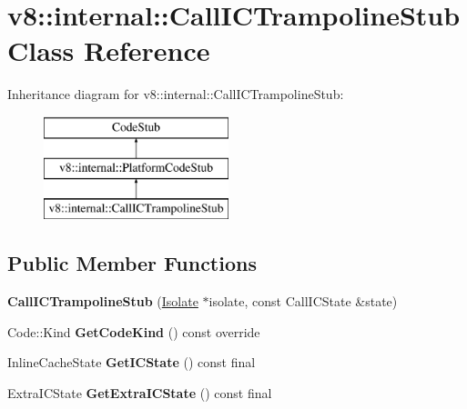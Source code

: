 \hypertarget{classv8_1_1internal_1_1_call_i_c_trampoline_stub}{}\section{v8\+:\+:internal\+:\+:Call\+I\+C\+Trampoline\+Stub Class Reference}
\label{classv8_1_1internal_1_1_call_i_c_trampoline_stub}
Inheritance diagram for v8\+:\+:internal\+:\+:Call\+I\+C\+Trampoline\+Stub\+:\begin{figure}[H]
\begin{center}
\leavevmode
\includegraphics[height=3.000000cm]{classv8_1_1internal_1_1_call_i_c_trampoline_stub}
\end{center}
\end{figure}
\subsection*{Public Member Functions}
\begin{DoxyCompactItemize}
\item 
{\bfseries Call\+I\+C\+Trampoline\+Stub} (\hyperlink{classv8_1_1internal_1_1_isolate}{Isolate} $\ast$isolate, const Call\+I\+C\+State \&state)\hypertarget{classv8_1_1internal_1_1_call_i_c_trampoline_stub_aae022f7160c1c1ddfa5053e37938018a}{}\label{classv8_1_1internal_1_1_call_i_c_trampoline_stub_aae022f7160c1c1ddfa5053e37938018a}

\item 
Code\+::\+Kind {\bfseries Get\+Code\+Kind} () const  override\hypertarget{classv8_1_1internal_1_1_call_i_c_trampoline_stub_acecd1d43322f926429f2ed2c1db71d10}{}\label{classv8_1_1internal_1_1_call_i_c_trampoline_stub_acecd1d43322f926429f2ed2c1db71d10}

\item 
Inline\+Cache\+State {\bfseries Get\+I\+C\+State} () const  final\hypertarget{classv8_1_1internal_1_1_call_i_c_trampoline_stub_a2239b457091eedd364229f6a80349b28}{}\label{classv8_1_1internal_1_1_call_i_c_trampoline_stub_a2239b457091eedd364229f6a80349b28}

\item 
Extra\+I\+C\+State {\bfseries Get\+Extra\+I\+C\+State} () const  final\hypertarget{classv8_1_1internal_1_1_call_i_c_trampoline_stub_ab1bafd1a2ebe69d1a94b0e3c4d4c3c07}{}\label{classv8_1_1internal_1_1_call_i_c_trampoline_stub_ab1bafd1a2ebe69d1a94b0e3c4d4c3c07}

\end{DoxyCompactItemize}
